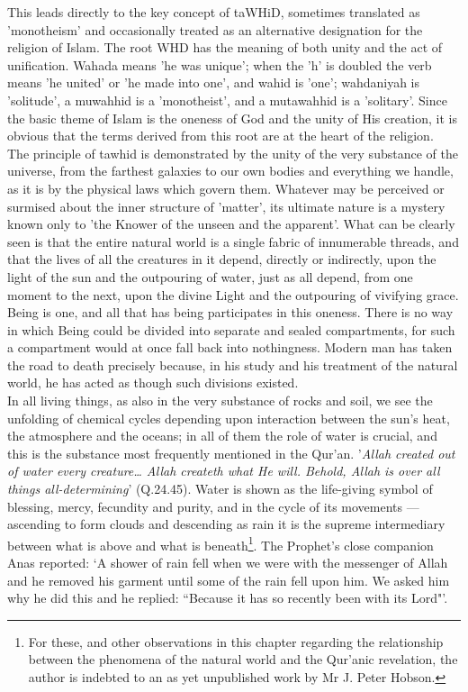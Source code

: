 \documentclass[10pt, twoside,openright]{book}
\begin{document}
This leads directly to the key concept of taWHiD, sometimes translated as 'monotheism' and 
occasionally treated as an alternative designation for the religion of Islam. The root WHD has the 
meaning of both unity and the act of unification. Wahada means 'he was unique'; when the 'h' is 
doubled the verb means 'he united' or 'he made into one', and wahid is 'one'; wahdaniyah is 
'solitude', a muwahhid is a 'monotheist', and a mutawahhid is a 'solitary'. Since the basic theme of 
Islam is the oneness of God and the unity of His creation, it is obvious that the terms derived from 
this root are at the heart of the religion. \\

The principle of tawhid is demonstrated by the unity of the very substance of the universe, from the 
farthest galaxies to our own bodies and everything we handle, as it is by the physical laws which 
govern them. Whatever may be perceived or surmised about the inner structure of 'matter', its 
ultimate nature is a mystery known only to 'the Knower of the unseen and the apparent'. What can be 
clearly seen is that the entire natural world is a single fabric of innumerable threads, and that the 
lives of all the creatures in it depend, directly or indirectly, upon the light of the sun and the 
outpouring of water, just as all depend, from one moment to the next, upon the divine Light and the 
outpouring of vivifying grace. Being is one, and all that has being participates in this oneness. 
There is no way in which Being could be divided into separate and sealed compartments, for such a 
compartment would at once fall back into nothingness. Modern man has taken the road to death 
precisely because, in his study and his treatment of the natural world, he has acted as though such 
divisions existed. \\

In all living things, as also in the very substance of rocks and soil, we see the unfolding of 
chemical cycles depending upon interaction between the sun's heat, the atmosphere and the oceans; in 
all of them the role of water is crucial, and this is the substance most frequently mentioned in the 
Qur'an. '\emph{Allah created out of water every creature\ldots{} Allah createth what He will. Behold, Allah is over all things all\hyp{}determining}' (Q.24.45). Water is shown as the life\hyp{}giving symbol of blessing, 
mercy, fecundity and purity, and in the cycle of its movements --- ascending to form clouds and 
descending as rain it is the supreme intermediary between what is above and what is beneath\footnote{For these, and other observations in this chapter regarding the relationship between the phenomena of the natural world and the Qur'anic revelation, the author is indebted to an as yet unpublished work by Mr J. Peter Hobson.}. The Prophet's close companion Anas reported: `A shower of rain fell when we were with the messenger of Allah and he removed his garment until some of the rain fell upon him. We asked him why he did this and he replied: ``Because it has so recently been with its Lord"'. \\
\end{document}
